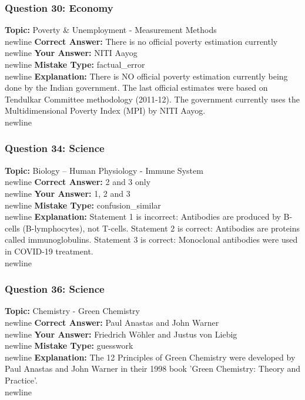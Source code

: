 \documentclass[a4paper,12pt]{article}
\begin{document}
\subsubsection{Question 30: Economy}
\textbf{Topic:} Poverty \& Unemployment - Measurement Methods\\newline
\textbf{Correct Answer:} There is no official poverty estimation currently\\newline
\textbf{Your Answer:} \textcolor{wrongred}{NITI Aayog}\\newline
\textbf{Mistake Type:} factual\_error\\newline
\textbf{Explanation:} There is NO official poverty estimation currently being done by the Indian government. The last official estimates were based on Tendulkar Committee methodology (2011-12). The government currently uses the Multidimensional Poverty Index (MPI) by NITI Aayog.\\newline
\vspace{0.5cm}
\subsubsection{Question 34: Science}
\textbf{Topic:} Biology – Human Physiology - Immune System\\newline
\textbf{Correct Answer:} 2 and 3 only\\newline
\textbf{Your Answer:} \textcolor{wrongred}{1, 2 and 3}\\newline
\textbf{Mistake Type:} confusion\_similar\\newline
\textbf{Explanation:} Statement 1 is incorrect: Antibodies are produced by B-cells (B-lymphocytes), not T-cells. Statement 2 is correct: Antibodies are proteins called immunoglobulins. Statement 3 is correct: Monoclonal antibodies were used in COVID-19 treatment.\\newline
\vspace{0.5cm}
\subsubsection{Question 36: Science}
\textbf{Topic:} Chemistry - Green Chemistry\\newline
\textbf{Correct Answer:} Paul Anastas and John Warner\\newline
\textbf{Your Answer:} \textcolor{wrongred}{Friedrich Wöhler and Justus von Liebig}\\newline
\textbf{Mistake Type:} guesswork\\newline
\textbf{Explanation:} The 12 Principles of Green Chemistry were developed by Paul Anastas and John Warner in their 1998 book 'Green Chemistry: Theory and Practice'.\\newline
\vspace{0.5cm}
\end{document}
